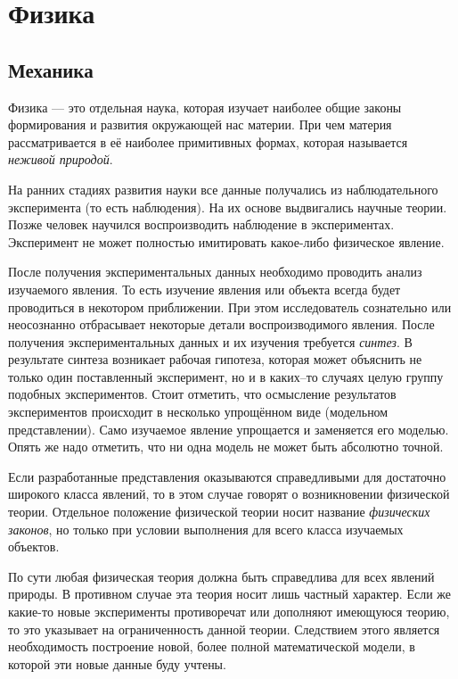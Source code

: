 \part{Физика}

\chapter{Механика}

Физика --- это отдельная наука, которая изучает наиболее общие законы
формирования и развития окружающей нас материи. При чем материя рассматривается
в её наиболее примитивных формах, которая называется \emph{неживой природой}.

На ранних стадиях развития науки все данные получались из наблюдательного
эксперимента (то есть наблюдения). На их основе выдвигались научные теории.
Позже человек научился воспроизводить наблюдение в экспериментах. Эксперимент
не может полностью имитировать какое-либо физическое явление.

После получения экспериментальных данных необходимо проводить анализ изучаемого
явления. То есть изучение явления или объекта всегда будет проводиться в
некотором приближении. При этом исследователь сознательно или неосознанно
отбрасывает некоторые детали воспроизводимого явления. После получения
экспериментальных данных и их изучения требуется \emph{синтез}. В результате
синтеза возникает рабочая гипотеза, которая может объяснить не только один
поставленный эксперимент, но и в каких--то случаях целую группу подобных
экспериментов. Стоит отметить, что осмысление результатов экспериментов
происходит в несколько упрощённом виде (модельном представлении). Само
изучаемое явление упрощается и заменяется его моделью. Опять же надо отметить,
что ни одна модель не может быть абсолютно точной.

Если разработанные представления оказываются справедливыми для достаточно
широкого класса явлений, то в этом случае говорят о возникновении физической
теории. Отдельное положение физической теории носит название \emph{физических
законов}, но только при условии выполнения для всего класса изучаемых объектов.

По сути любая физическая теория должна быть справедлива для всех явлений
природы. В противном случае эта теория носит лишь частный характер. Если же
какие-то новые эксперименты противоречат или дополняют имеющуюся теорию, то
это указывает на ограниченность данной теории. Следствием этого является
необходимость построение новой, более полной математической модели, в
которой эти новые данные буду учтены.

